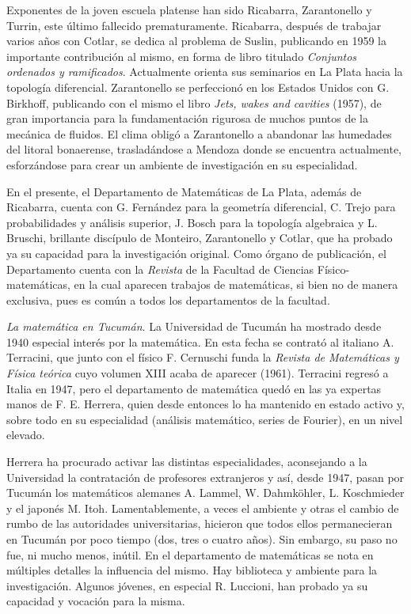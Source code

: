 Exponentes de la joven escuela platense han sido Ricabarra, Zarantonello y
Turrin, este último fallecido prematuramente. Ricabarra, después de trabajar
varios años con Cotlar, se dedica al problema de Suslin, publicando en 1959 la
importante contribución al mismo, en forma de libro titulado \emph{Conjuntos
ordenados y ramificados}. Actualmente orienta sus seminarios en La Plata hacia
la topología diferencial. Zarantonello se perfeccionó en los Estados Unidos con
G. Birkhoff, publicando con el mismo el libro \emph{Jets, wakes and cavities}
(1957), de gran importancia para la fundamentación rigurosa de muchos puntos de
la mecánica de fluidos. El clima obligó a Zarantonello a abandonar las
humedades del litoral bonaerense, trasladándose a Mendoza donde se encuentra
actualmente, esforzándose para crear un ambiente de investigación en su
especialidad.

En el presente, el Departamento de Matemáticas de La Plata, además de
Ricabarra, cuenta con G. Fernández para la geometría diferencial, C. Trejo para
probabilidades y análisis superior, J. Bosch para la topología algebraica y L.
Bruschi, brillante discípulo de Monteiro, Zarantonello y Cotlar, que ha probado
ya su capacidad para la investigación original. Como órgano de publicación, el
Departamento cuenta con la \emph{Revista} de la Facultad de Ciencias
Físico-matemáticas, en la cual aparecen trabajos de matemáticas, si bien no de
manera exclusiva, pues es común a todos los departamentos de la facultad.

\emph{La matemática en Tucumán}. La Universidad de Tucumán ha mostrado desde
1940 especial interés por la matemática. En esta fecha se contrató al italiano
A. Terracini, que junto con el físico F. Cernuschi funda la \emph{Revista de
Matemáticas y Física teórica} cuyo volumen XIII acaba de aparecer (1961).
Terracini regresó a Italia en 1947, pero el departamento de matemática quedó en
las ya expertas manos de F. E. Herrera, quien desde entonces lo ha mantenido en
estado activo y, sobre todo en su especialidad (análisis matemático, series de
Fourier), en un nivel elevado.

Herrera ha procurado activar las distintas especialidades, aconsejando a la
Universidad la contratación de profesores extranjeros y así, desde 1947, pasan
por Tucumán los matemáticos alemanes A. Lammel, W. Dahmk\"ohler, L. Koschmieder
y el japonés M. Itoh. Lamentablemente, a veces el ambiente y otras el cambio de
rumbo de las autoridades universitarias, hicieron que todos ellos permanecieran
en Tucumán por poco tiempo (dos, tres o cuatro años). Sin embargo, su paso no
fue, ni mucho menos, inútil. En el departamento de matemáticas se nota en
múltiples detalles la influencia del mismo. Hay biblioteca y ambiente para la
investigación. Algunos jóvenes, en especial R. Luccioni, han probado ya su
capacidad y vocación para la misma.

